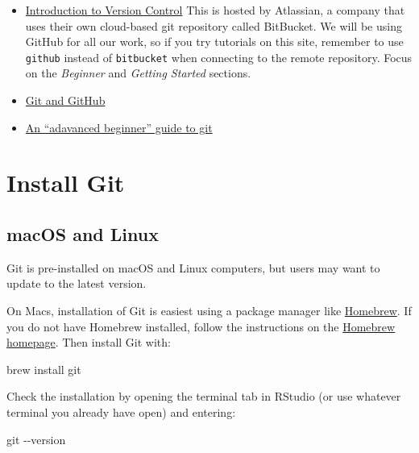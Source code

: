 \documentclass[
  letterpaper,
  DIV=11,
  numbers=noendperiod]{scrreprt}
\newenvironment{Shaded}{\begin{snugshade}}{\end{snugshade}}
\newcommand{\AttributeTok}[1]{\textcolor[rgb]{0.40,0.45,0.13}{#1}}
\newcommand{\ExtensionTok}[1]{\textcolor[rgb]{0.00,0.23,0.31}{#1}}
\newcommand{\FunctionTok}[1]{\textcolor[rgb]{0.28,0.35,0.67}{#1}}
\newcommand{\NormalTok}[1]{\textcolor[rgb]{0.00,0.23,0.31}{#1}}
\providecommand{\tightlist}{%
  \setlength{\itemsep}{0pt}\setlength{\parskip}{0pt}}\usepackage{longtable,booktabs,array}
\begin{document}
\begin{itemize}
\tightlist
\item
  \href{https://www.atlassian.com/git/tutorials/what-is-version-control}{Introduction
  to Version Control} This is hosted by Atlassian, a company that uses
  their own cloud-based git repository called BitBucket. We will be
  using GitHub for all our work, so if you try tutorials on this site,
  remember to use \texttt{github} instead of \texttt{bitbucket} when
  connecting to the remote repository. Focus on the \emph{Beginner} and
  \emph{Getting Started} sections.
\item
  \href{https://github.com/carpentries-incubator/reproducible-publications-quarto/blob/main/setup.md}{Git
  and GitHub}
\item
  \href{https://think-like-a-git.net/sections/about-this-site.html}{An
  ``adavanced beginner'' guide to git}
\end{itemize}

\section{Install Git}\label{install-git}

\subsection{macOS and Linux}\label{macos-and-linux}

Git is pre-installed on macOS and Linux computers, but users may want to
update to the latest version.

On Macs, installation of Git is easiest using a package manager like
\href{https://brew.sh/}{Homebrew}. If you do not have Homebrew
installed, follow the instructions on the
\href{https://brew.sh/}{Homebrew homepage}. Then install Git with:

\begin{Shaded}
\begin{Highlighting}[]
\ExtensionTok{brew}\NormalTok{ install git}
\end{Highlighting}
\end{Shaded}

Check the installation by opening the terminal tab in RStudio (or use
whatever terminal you already have open) and entering:

\begin{Shaded}
\begin{Highlighting}[]
\FunctionTok{git} \AttributeTok{{-}{-}version}
\end{Highlighting}
\end{Shaded}
\end{document}
